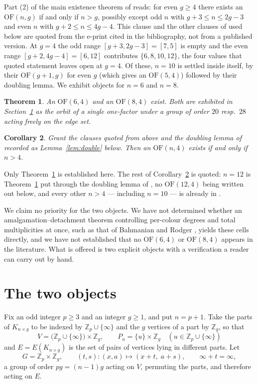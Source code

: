 \documentclass[11pt]{amsart}
\newtheorem{theorem}{Theorem}
\newtheorem{corollary}[theorem]{Corollary}
\theoremstyle{remark}
\newcommand{\OF}{\mathrm{OF}}
\newcommand{\Km}[2]{K_{#1\times #2}}
\newcommand{\Zp}{\mathbb Z}
\begin{document}
Part (2) of the main existence theorem of \cite{TZE} reads: for even $g\ge4$
there exists an $\OF(n,g)$ if and only if $n>g$, possibly except odd $n$ with
$g+3\le n\le2g-3$ and even $n$ with $g+2\le n\le4g-4$. This clause and the other
clauses of \cite{TZE} used below are quoted from the e-print cited in the
bibliography, not from a published version. At $g=4$ the
odd range $[g+3,2g-3]=[7,5]$ is empty and the even range $[g+2,4g-4]=[6,12]$
contributes $\{6,8,10,12\}$, the four values that quoted statement leaves open
at $g=4$. Of these, $n=10$ is settled inside \cite{TZE} itself, by their
$\OF(g+1,g)$ for even $g$ (which gives an $\OF(5,4)$) followed by their
doubling lemma. We exhibit objects for $n=6$ and $n=8$.

\begin{theorem}\label{thm:main}
An $\OF(6,4)$ and an $\OF(8,4)$ exist. Both are exhibited in
Section~\textup{\ref{sec:objects}} as the orbit of a single one-factor under a
group of order $20$ resp.\ $28$ acting freely on the edge set.
\end{theorem}

\begin{corollary}\label{cor:spectrum}
Grant the clauses quoted from \cite{TZE} above and the doubling lemma of
\cite{TZE} recorded as Lemma~\textup{\ref{lem:double}} below. Then an $\OF(n,4)$
exists if and only if $n>4$.
\end{corollary}

Only Theorem~\ref{thm:main} is established here. The rest of
Corollary~\ref{cor:spectrum} is quoted: $n=12$ is Theorem~\ref{thm:main} put
through the doubling lemma of \cite{TZE}, no $\OF(12,4)$ being written out
below, and every other $n>4$ --- including $n=10$ --- is already in \cite{TZE}.

We claim no priority for the two objects. We have not determined whether an
amalgamation--detachment theorem controlling per-colour degrees and total
multiplicities at once, such as that of Bahmanian and Rodger
\cite{BahmanianRodger}, yields these cells directly, and we have not established
that no $\OF(6,4)$ or $\OF(8,4)$ appears in the literature. What is offered is
two explicit objects with a verification a reader can carry out by hand.

\section{The two objects}\label{sec:objects}

Fix an odd integer $p\ge3$ and an integer $g\ge1$, and put $n=p+1$. Take the
parts of $\Km ng$ to be indexed by $\Zp_p\cup\{\infty\}$ and the $g$ vertices
of a part by $\Zp_g$, so that
\[
 V=\bigl(\Zp_p\cup\{\infty\}\bigr)\times\Zp_g,
 \qquad
 P_u=\{u\}\times\Zp_g \quad(u\in\Zp_p\cup\{\infty\})
\]
and $E=E(\Km ng)$ is the set of pairs of vertices lying in different parts. Let
\[
 G=\Zp_p\times\Zp_g,
 \qquad
 (t,s)\colon (x,a)\longmapsto (x+t,\;a+s),
 \qquad \infty+t=\infty ,
\]
a group of order $pg=(n-1)g$ acting on $V$, permuting the parts, and therefore
acting on $E$.
\end{document}
